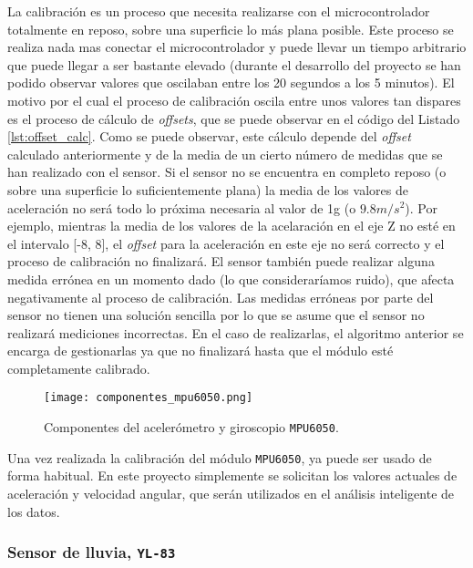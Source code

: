 La calibración es un proceso que necesita realizarse con el microcontrolador totalmente en reposo, sobre una superficie lo más plana posible. Este proceso se realiza nada mas conectar el microcontrolador y puede llevar un tiempo arbitrario que puede llegar a ser bastante elevado (durante el desarrollo del proyecto se han podido observar valores que oscilaban entre los 20 segundos a los 5 minutos). El motivo por el cual el proceso de calibración oscila entre unos valores tan dispares es el proceso de cálculo de \textit{offsets}, que se puede observar en el código del Listado \ref{lst:offset_calc}. Como se puede observar, este cálculo depende del \textit{offset} calculado anteriormente y de la media de un cierto número de medidas que se han realizado con el sensor. Si el sensor no se encuentra en completo reposo (o sobre una superficie lo suficientemente plana) la media de los valores de aceleración no será todo lo próxima necesaria al valor de 1g (o $9.8m/s^2$). Por ejemplo, mientras la media de los valores de la acelaración en el eje Z no esté en el intervalo [-8, 8], el \textit{offset} para la aceleración en este eje no será correcto y el proceso de calibración no finalizará. El sensor también puede realizar alguna medida errónea en un momento dado (lo que consideraríamos ruido), que afecta negativamente al proceso de calibración. Las medidas erróneas por parte del sensor no tienen una solución sencilla por lo que se asume que el sensor no realizará mediciones incorrectas. En el caso de realizarlas, el algoritmo anterior se encarga de gestionarlas ya que no finalizará hasta que el módulo esté completamente calibrado.

\begin{figure}[!h]
\begin{center}
\texttt{[image: componentes\_mpu6050.png]}
\caption{Componentes del acelerómetro y giroscopio \texttt{MPU6050}.}
\label{fig:componentes_mpu6050}
\end{center}
\end{figure}

Una vez realizada la calibración del módulo \texttt{MPU6050}, ya puede ser usado de forma habitual. En este proyecto simplemente se solicitan los valores actuales de aceleración y velocidad angular, que serán utilizados en el análisis inteligente de los datos.

\subsubsection{Sensor de lluvia, \texttt{YL-83}}


